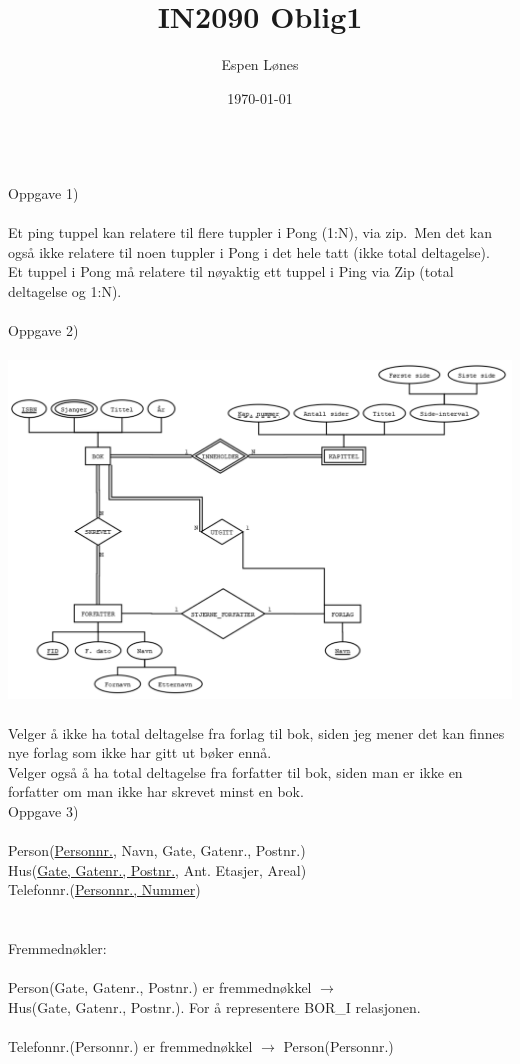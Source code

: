 \documentclass[12pt, letterpaper, twoside]{article}
\begin{document}
\title{IN2090 Oblig1}
\author{Espen Lønes}
\date{\today}
\maketitle
\ \\
Oppgave 1)\\
\ \\
Et ping tuppel kan relatere til flere tuppler i Pong (1:N), via zip.\ Men det kan også ikke relatere til noen tuppler i Pong i det hele tatt (ikke total deltagelse).\\
Et tuppel i Pong må relatere til nøyaktig ett tuppel i Ping via Zip (total deltagelse og 1:N).\\
\newpage
\ \\
Oppgave 2)\\
\ \\
\includegraphics[scale=0.5]{Oppgave2.png}\\
\ \\
Velger å ikke ha total deltagelse fra forlag til bok, siden jeg mener det kan finnes nye forlag som ikke har gitt ut bøker ennå.\\
Velger også å ha total deltagelse fra forfatter til bok, siden man er ikke en forfatter om man ikke har skrevet minst en bok.
\newpage
\ \\
Oppgave 3)\ \\
\ \\
Person(\underline{Personnr.}, Navn, Gate, Gatenr., Postnr.)
\ \\
Hus(\underline{Gate, Gatenr., Postnr.}, Ant. Etasjer, Areal)
\ \\
Telefonnr.(\underline{Personnr., Nummer})
\ \\
\ \\
\ \\
Fremmednøkler:\\
\ \\
Person(Gate, Gatenr., Postnr.) er fremmednøkkel $\rightarrow$ \\
Hus(Gate, Gatenr., Postnr.). For å representere BOR\_I relasjonen.
\ \\
\ \\
Telefonnr.(Personnr.) er fremmednøkkel $\rightarrow$ Person(Personnr.)
\end{document}
